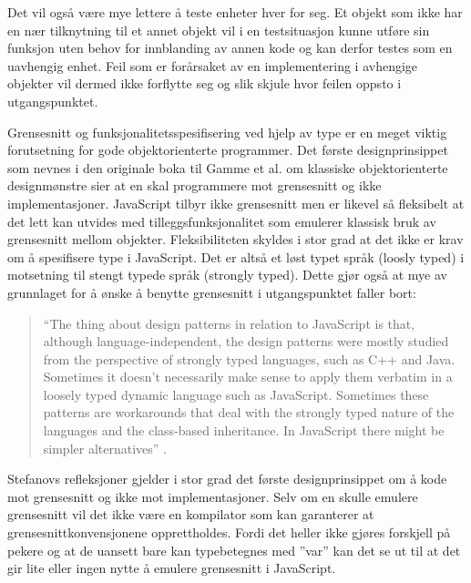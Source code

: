 \documentclass[norsk]{article}
\begin{document}
Det vil også være mye lettere å teste enheter hver for seg. Et objekt som ikke har en nær tilknytning til et annet objekt vil i en testsituasjon kunne utføre sin funksjon uten behov for innblanding av annen kode og kan derfor testes som en uavhengig enhet. Feil som er forårsaket av en implementering i avhengige objekter vil dermed ikke forflytte seg og slik skjule hvor feilen oppsto i utgangspunktet.

Grensesnitt og funksjonalitetsspesifisering ved hjelp av type er en meget viktig forutsetning for gode objektorienterte programmer. Det første designprinsippet som nevnes i den originale boka til Gamme et al. om klassiske objektorienterte designmønstre sier at en skal programmere mot grensesnitt og ikke implementasjoner. JavaScript tilbyr ikke grensesnitt men er likevel så fleksibelt at det lett kan utvides med tilleggsfunksjonalitet som emulerer klassisk bruk av grensesnitt mellom objekter. Fleksibiliteten skyldes i stor grad at det ikke er krav om å spesifisere type i JavaScript. Det er altså et løst typet språk (loosly typed) i motsetning til stengt typede språk (strongly typed). Dette gjør også at mye av grunnlaget for å ønske å benytte grensesnitt i utgangspunktet faller bort:
\begin{quotation}
“The thing about design patterns in relation to JavaScript is that, although language-independent, the design patterns were mostly studied from the perspective of strongly typed languages, such as C++ and Java. Sometimes it doesn’t necessarily make sense to apply them verbatim in a loosely typed dynamic language such as JavaScript. Sometimes these patterns are workarounds that deal with the strongly typed nature of the languages and the class-based inheritance. In JavaScript there might be simpler alternatives” \parencite[s. 2]{stefanov}.
\end{quotation}

Stefanovs refleksjoner gjelder i stor grad det første designprinsippet om å kode mot grensesnitt og ikke mot implementasjoner. Selv om en skulle emulere grensesnitt vil det ikke være en kompilator som kan garanterer at grensesnittkonvensjonene opprettholdes. Fordi det heller ikke gjøres forskjell på pekere og at de uansett bare kan typebetegnes med ”var” kan det se ut til at det gir lite eller ingen nytte å emulere grensesnitt i JavaScript.
\end{document}
